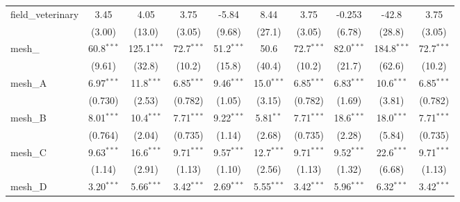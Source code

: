 \begin{tabular}{lccccccccc}
   field\_veterinary                                           & 3.45          & 4.05           & 3.75          & -5.84         & 8.44          & 3.75          & -0.253        & -42.8          & 3.75\\   
                                                               & (3.00)        & (13.0)         & (3.05)        & (9.68)        & (27.1)        & (3.05)        & (6.78)        & (28.8)         & (3.05)\\   
   mesh\_                                                      & 60.8$^{***}$  & 125.1$^{***}$  & 72.7$^{***}$  & 51.2$^{***}$  & 50.6          & 72.7$^{***}$  & 82.0$^{***}$  & 184.8$^{***}$  & 72.7$^{***}$\\   
                                                               & (9.61)        & (32.8)         & (10.2)        & (15.8)        & (40.4)        & (10.2)        & (21.7)        & (62.6)         & (10.2)\\   
   mesh\_A                                                     & 6.97$^{***}$  & 11.8$^{***}$   & 6.85$^{***}$  & 9.46$^{***}$  & 15.0$^{***}$  & 6.85$^{***}$  & 6.83$^{***}$  & 10.6$^{***}$   & 6.85$^{***}$\\   
                                                               & (0.730)       & (2.53)         & (0.782)       & (1.05)        & (3.15)        & (0.782)       & (1.69)        & (3.81)         & (0.782)\\   
   mesh\_B                                                     & 8.01$^{***}$  & 10.4$^{***}$   & 7.71$^{***}$  & 9.22$^{***}$  & 5.81$^{**}$   & 7.71$^{***}$  & 18.6$^{***}$  & 18.0$^{***}$   & 7.71$^{***}$\\   
                                                               & (0.764)       & (2.04)         & (0.735)       & (1.14)        & (2.68)        & (0.735)       & (2.28)        & (5.84)         & (0.735)\\   
   mesh\_C                                                     & 9.63$^{***}$  & 16.6$^{***}$   & 9.71$^{***}$  & 9.57$^{***}$  & 12.7$^{***}$  & 9.71$^{***}$  & 9.52$^{***}$  & 22.6$^{***}$   & 9.71$^{***}$\\   
                                                               & (1.14)        & (2.91)         & (1.13)        & (1.10)        & (2.56)        & (1.13)        & (1.32)        & (6.68)         & (1.13)\\   
   mesh\_D                                                     & 3.20$^{***}$  & 5.66$^{***}$   & 3.42$^{***}$  & 2.69$^{***}$  & 5.55$^{***}$  & 3.42$^{***}$  & 5.96$^{***}$  & 6.32$^{***}$   & 3.42$^{***}$\\   

\end{tabular}
